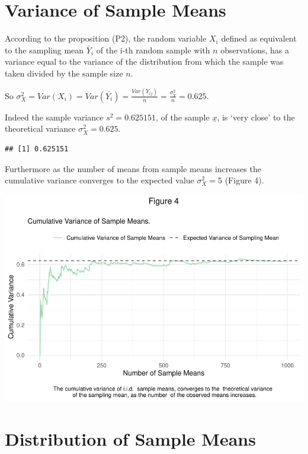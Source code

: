 \documentclass[
]{article}
\begin{document}
       \hypertarget{variance-of-sample-means}{%
       \section{Variance of Sample
       Means}\label{variance-of-sample-means}}

       According to the proposition (P2), the random variable \(X_i\)
       defined as equivalent to the sampling mean \(\bar{Y}_i\) of the
       i-th random sample with \(n\) observations, has a variance equal
       to the variance of the distribution from which the sample was
       taken divided by the sample size \(n\).

       So
       \(\sigma_X^2 = Var(X_i) = Var(\bar{Y_i}) = \frac{Var(Y_{ij})}{n} = \frac{\sigma_Y^2}{n} = 0.625\).

       Indeed the sample variance \(s^2 = 0.625151\), of the sample
       \(\underline{x}\), is `very close' to the theoretical variance
       \(\sigma_X^2 = 0.625\).

\begin{verbatim}
## [1] 0.625151
\end{verbatim}

       Furthermore as the number of means from sample means increases
       the cumulative variance converges to the expected value
       \(\sigma_X^2 = 5\) (Figure 4).

       \includegraphics{CLT_files/figure-latex/unnamed-chunk-12-1.pdf}
       \newpage

       \hypertarget{distribution-of-sample-means}{%
       \section{Distribution of Sample
       Means}\label{distribution-of-sample-means}}
\end{document}
